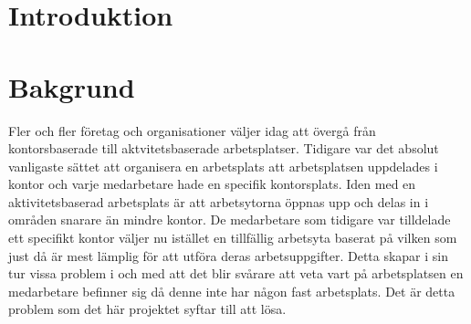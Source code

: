 \documentclass[swedish, a4paper,12pt]{article}
\begin{document}
\section{Introduktion}

\section{Bakgrund}
Fler och fler företag och organisationer väljer idag att övergå från kontorsbaserade till aktvitetsbaserade
arbetsplatser. Tidigare var det absolut vanligaste sättet att organisera en arbetsplats att arbetsplatsen uppdelades i kontor och varje medarbetare hade en specifik kontorsplats.
Iden med en aktivitetsbaserad arbetsplats är att arbetsytorna öppnas upp och delas in i områden snarare än mindre kontor. De medarbetare som tidigare var tilldelade ett specifikt kontor
väljer nu istället en tillfällig arbetsyta baserat på vilken som just då
är mest lämplig för att utföra deras arbetsuppgifter.
\bigskip
\newline
Detta skapar i sin tur vissa problem i och med att det blir svårare att veta vart på arbetsplatsen en medarbetare befinner sig då denne inte har någon fast arbetsplats.
Det är detta problem som det här projektet syftar till att lösa.
\end{document}
